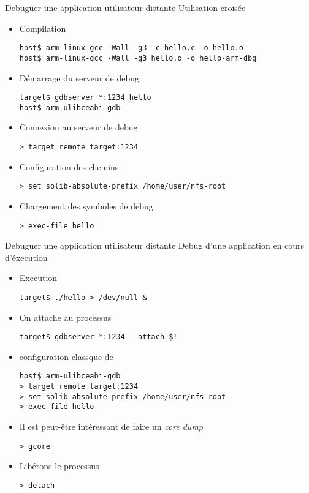 \begin{frame}[fragile=singleslide]{Debuguer une application utilisateur distante}
  Utilisation croisée
  \begin{itemize}
  \item Compilation
    \begin{lstlisting}
host$ arm-linux-gcc -Wall -g3 -c hello.c -o hello.o
host$ arm-linux-gcc -Wall -g3 hello.o -o hello-arm-dbg
    \end{lstlisting}
  \item Démarrage du serveur de debug
    \begin{lstlisting}
target$ gdbserver *:1234 hello
host$ arm-ulibceabi-gdb
    \end{lstlisting}
  \item Connexion au serveur de debug
    \begin{lstlisting}
> target remote target:1234
    \end{lstlisting}
  \item Configuration des chemins
    \begin{lstlisting}
> set solib-absolute-prefix /home/user/nfs-root
    \end{lstlisting}
  \item Chargement des symboles de debug
    \begin{lstlisting}
> exec-file hello
    \end{lstlisting}  
  \end{itemize}
\end{frame}

\begin{frame}[fragile=singleslide]{Debuguer une application utilisateur distante}
  Debug d'une application en cours d'éxecution
  \begin{itemize}
  \item Execution
    \begin{lstlisting}
target$ ./hello > /dev/null & 
    \end{lstlisting}  
  \item On attache  au processus
    \begin{lstlisting}
target$ gdbserver *:1234 --attach $!
    \end{lstlisting}  
  \item configuration classque de 
    \begin{lstlisting}
host$ arm-ulibceabi-gdb
> target remote target:1234
> set solib-absolute-prefix /home/user/nfs-root
> exec-file hello
    \end{lstlisting}  
  \item Il est peut-être intéressant de faire un \emph{core dump}
    \begin{lstlisting}
> gcore
    \end{lstlisting}  
  \item Libérons le processus
    \begin{lstlisting}
> detach
    \end{lstlisting}  
  \end{itemize}
\end{frame}

